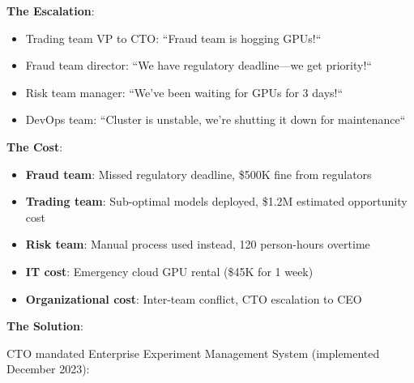 \textbf{The Escalation}:

\begin{itemize}
    \item Trading team VP to CTO: ``Fraud team is hogging GPUs!``
    \item Fraud team director: ``We have regulatory deadline---we get priority!``
    \item Risk team manager: ``We've been waiting for GPUs for 3 days!``
    \item DevOps team: ``Cluster is unstable, we're shutting it down for maintenance``
\end{itemize}

\textbf{The Cost}:

\begin{itemize}
    \item \textbf{Fraud team}: Missed regulatory deadline, \$500K fine from regulators
    \item \textbf{Trading team}: Sub-optimal models deployed, \$1.2M estimated opportunity cost
    \item \textbf{Risk team}: Manual process used instead, 120 person-hours overtime
    \item \textbf{IT cost}: Emergency cloud GPU rental (\$45K for 1 week)
    \item \textbf{Organizational cost}: Inter-team conflict, CTO escalation to CEO
\end{itemize}

\textbf{The Solution}:

CTO mandated Enterprise Experiment Management System (implemented December 2023):

